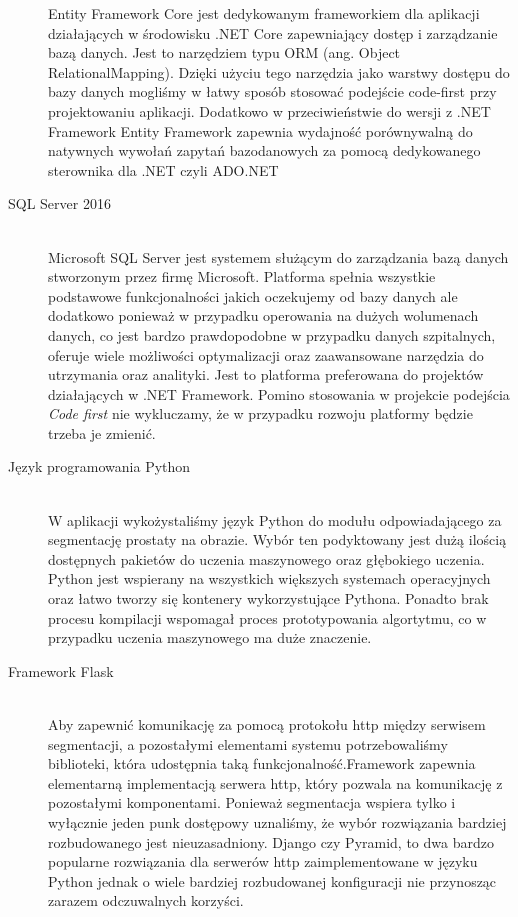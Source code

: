 \documentclass[a4paper,11pt,twoside]{report}
\theoremstyle{definition}
\begin{document}
\begin{description}
Entity Framework Core jest dedykowanym frameworkiem dla aplikacji działających w środowisku .NET Core zapewniający dostęp i zarządzanie bazą danych. Jest to narzędziem typu ORM (ang. Object RelationalMapping). Dzięki użyciu tego narzędzia jako warstwy dostępu do bazy danych mogliśmy w łatwy sposób stosować podejście code-first przy projektowaniu aplikacji. Dodatkowo w przeciwieństwie do wersji z .NET Framework Entity Framework zapewnia wydajność porównywalną do natywnych wywołań zapytań bazodanowych za pomocą dedykowanego sterownika dla .NET czyli ADO.NET
\item [SQL Server 2016] \hfill \\
Microsoft SQL Server jest systemem służącym do zarządzania bazą danych stworzonym przez firmę Microsoft. Platforma spełnia wszystkie podstawowe funkcjonalności jakich oczekujemy od bazy danych ale dodatkowo ponieważ w przypadku operowania na dużych wolumenach danych, co jest bardzo prawdopodobne w przypadku danych szpitalnych, oferuje wiele możliwości optymalizacji oraz zaawansowane narzędzia do utrzymania oraz analityki. Jest to platforma preferowana do projektów działających w .NET Framework. Pomino stosowania w projekcie podejścia \textit{Code first} nie wykluczamy, że w przypadku rozwoju platformy będzie trzeba je zmienić.
\item [Język programowania Python ] \hfill \\
W aplikacji wykożystaliśmy język Python do modułu odpowiadającego za segmentację prostaty na obrazie. Wybór ten podyktowany jest dużą ilością dostępnych pakietów do uczenia maszynowego oraz głębokiego uczenia. Python jest wspierany na wszystkich większych systemach operacyjnych oraz łatwo tworzy się kontenery wykorzystujące Pythona. Ponadto brak procesu kompilacji wspomagał proces prototypowania algortytmu, co w przypadku uczenia maszynowego ma duże znaczenie. 
\item [Framework Flask ] \hfill \\
Aby zapewnić komunikację za pomocą protokołu http między serwisem segmentacji, a pozostałymi elementami systemu potrzebowaliśmy biblioteki, która udostępnia taką funkcjonalność.Framework zapewnia elementarną implementacją serwera http, który pozwala na komunikację z pozostałymi komponentami. Ponieważ segmentacja wspiera tylko i wyłącznie jeden punk dostępowy uznaliśmy, że wybór rozwiązania bardziej rozbudowanego jest nieuzasadniony. Django czy Pyramid, to dwa bardzo popularne rozwiązania dla serwerów http zaimplementowane w języku Python jednak o wiele bardziej rozbudowanej konfiguracji nie przynosząc zarazem odczuwalnych korzyści.

\end{description}
\end{document}
